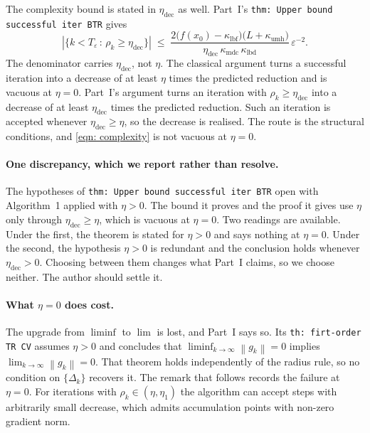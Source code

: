 \documentclass[11pt,a4paper]{article}
\providecommand{\abs}[1]{\left \vert #1 \right \vert}
\providecommand{\norm}[1]{\left \lVert #1 \right \rVert}
\providecommand*\mykappa[1]{ \kappa_{\scriptscriptstyle \text{#1}} }
\providecommand*\myeta[1]{ \eta_{\scriptscriptstyle \text{#1}} }
\begin{document}
The complexity bound is stated in $\myeta{dec}$ as well. Part~I's
\texttt{thm: Upper bound successful iter BTR} gives
\begin{equation}
  \abs{\{k < T_\varepsilon \, : \, \rho_k \geq \myeta{dec}\}}
  \;\leq\;
  \frac{2\big(f(x_0) - \mykappa{lbf}\big)\big(L + \mykappa{umh}\big)}
       {\myeta{dec}\,\mykappa{mdc}\,\mykappa{lbd}}\,\varepsilon^{-2} .
  \label{eqn: complexity}
\end{equation}
The denominator carries $\myeta{dec}$, not $\eta$. The classical argument turns
a successful iteration into a decrease of at least $\eta$ times the predicted
reduction and is vacuous at $\eta = 0$. Part~I's argument turns an iteration
with $\rho_k \geq \myeta{dec}$ into a decrease of at least $\myeta{dec}$ times
the predicted reduction. Such an iteration is accepted whenever
$\myeta{dec} \geq \eta$, so the decrease is realised. The route is the
structural conditions, and \eqref{eqn: complexity} is not vacuous at $\eta = 0$.

\paragraph{One discrepancy, which we report rather than resolve.}
The hypotheses of \texttt{thm: Upper bound successful iter BTR} open with
Algorithm~1 applied with $\eta > 0$. The bound it proves and the proof it gives
use $\eta$ only through $\myeta{dec} \geq \eta$, which is vacuous at $\eta = 0$.
Two readings are available. Under the first, the theorem is stated for
$\eta > 0$ and says nothing at $\eta = 0$. Under the second, the hypothesis
$\eta > 0$ is redundant and the conclusion holds whenever
$\myeta{dec} > 0$. Choosing between them changes what Part~I claims, so we
choose neither. The author should settle it.

\paragraph{What $\eta = 0$ does cost.}
The upgrade from $\liminf$ to $\lim$ is lost, and Part~I says so. Its
\texttt{th: firt-order TR CV} assumes $\eta > 0$ and concludes that
$\liminf_{k \to \infty}\norm{g_k} = 0$ implies
$\lim_{k \to \infty}\norm{g_k} = 0$. That theorem holds independently of the
radius rule, so no condition on $\{\Delta_k\}$ recovers it. The remark that
follows records the failure at $\eta = 0$. For iterations with
$\rho_k \in (\eta, \eta_1)$ the algorithm can accept steps with arbitrarily
small decrease, which admits accumulation points with non-zero gradient norm.
\end{document}
